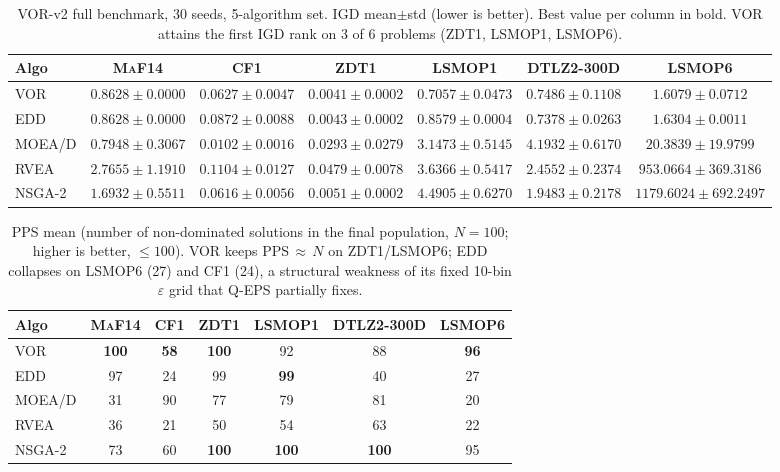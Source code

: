 \documentclass[preprint,12pt]{elsarticle}
\begin{document}
\begin{landscape}
\begin{table}[t]
\centering
\caption{VOR-v2 full benchmark, 30 seeds, 5-algorithm set. IGD
mean$\pm$std (lower is better). Best value per column in bold.
\textsc{VOR} attains the first IGD rank on 3 of 6 problems
(\textsc{ZDT1}, \textsc{LSMOP1}, \textsc{LSMOP6}).}
\label{tab:main}
\footnotesize
\setlength{\tabcolsep}{4pt}
\begin{tabular}{@{}l*{6}{c}@{}}
\toprule
\textbf{Algo} & \textsc{MaF14} & \textsc{CF1} & \textsc{ZDT1}
 & \textsc{LSMOP1} & \textsc{DTLZ2}-300D & \textsc{LSMOP6}\\
\midrule
\textsc{VOR}  & $0.8628{\pm}0.0000$ & $0.0627{\pm}0.0047$
  & \textbf{$0.0041{\pm}0.0002$} & \textbf{$0.7057{\pm}0.0473$}
  & $0.7486{\pm}0.1108$ & \textbf{$1.6079{\pm}0.0712$}\\
\textsc{EDD}  & $0.8628{\pm}0.0000$ & $0.0872{\pm}0.0088$
  & $0.0043{\pm}0.0002$ & $0.8579{\pm}0.0004$
  & \textbf{$0.7378{\pm}0.0263$} & $1.6304{\pm}0.0011$\\
\textsc{MOEA/D}& \textbf{$0.7948{\pm}0.3067$} & \textbf{$0.0102{\pm}0.0016$}
  & $0.0293{\pm}0.0279$ & $3.1473{\pm}0.5145$
  & $4.1932{\pm}0.6170$ & $20.3839{\pm}19.9799$\\
\textsc{RVEA} & $2.7655{\pm}1.1910$ & $0.1104{\pm}0.0127$
  & $0.0479{\pm}0.0078$ & $3.6366{\pm}0.5417$
  & $2.4552{\pm}0.2374$ & $953.0664{\pm}369.3186$\\
\textsc{NSGA-2}& $1.6932{\pm}0.5511$ & $0.0616{\pm}0.0056$
  & $0.0051{\pm}0.0002$ & $4.4905{\pm}0.6270$
  & $1.9483{\pm}0.2178$ & $1179.6024{\pm}692.2497$\\
\bottomrule
\end{tabular}
\end{table}
\end{landscape}

\begin{table}[t]
\centering
\caption{PPS mean (number of non-dominated solutions in the final
population, $N=100$; higher is better, $\le 100$). \textsc{VOR} keeps
PPS$\,\approx\,N$ on \textsc{ZDT1}/\textsc{LSMOP6}; \textsc{EDD}
collapses on \textsc{LSMOP6} (27) and \textsc{CF1} (24), a structural
weakness of its fixed 10-bin $\varepsilon$ grid that \textsc{Q-EPS}
partially fixes.}
\label{tab:pps}
\small
\setlength{\tabcolsep}{4.5pt}
\begin{tabular}{lcccccc}
\toprule
\textbf{Algo} & \textsc{MaF14} & \textsc{CF1} & \textsc{ZDT1}
 & \textsc{LSMOP1} & \textsc{DTLZ2}-300D & \textsc{LSMOP6}\\
\midrule
\textsc{VOR}  & \textbf{100} & \textbf{58} & \textbf{100} & 92 & 88
  & \textbf{96}\\
\textsc{EDD}  & 97 & 24 & 99 & \textbf{99} & 40 & 27\\
\textsc{MOEA/D}& 31 & 90 & 77 & 79 & 81 & 20\\
\textsc{RVEA} & 36 & 21 & 50 & 54 & 63 & 22\\
\textsc{NSGA-2}& 73 & 60 & \textbf{100} & \textbf{100} & \textbf{100}
  & 95\\
\bottomrule
\end{tabular}
\end{table}
\end{document}
